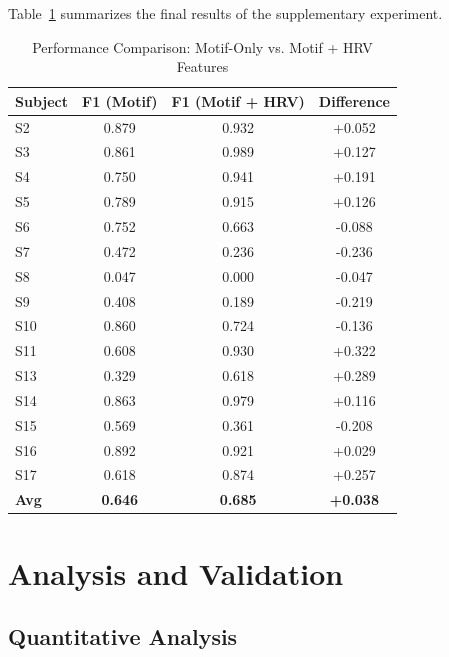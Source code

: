 \documentclass[conference,10pt]{IEEEtran}
\begin{document}
Table~\ref{tab:hrv_comparison} summarizes the final results of the supplementary experiment. 

\begin{table}[htbp]
\centering
\scriptsize
\renewcommand{\arraystretch}{0.85}
\caption{Performance Comparison: Motif-Only vs. Motif + HRV Features}
\label{tab:hrv_comparison}
\begin{tabular}{lccc}
\hline
\textbf{Subject} & \textbf{F1 (Motif)} & \textbf{F1 (Motif + HRV)} & \textbf{Difference} \\
\hline
S2  & 0.879 & 0.932 & +0.052 \\
S3  & 0.861 & 0.989 & +0.127 \\
S4  & 0.750 & 0.941 & +0.191 \\
S5  & 0.789 & 0.915 & +0.126 \\
S6  & 0.752 & 0.663 & -0.088 \\
S7  & 0.472 & 0.236 & -0.236 \\
S8  & 0.047 & 0.000 & -0.047 \\
S9  & 0.408 & 0.189 & -0.219 \\
S10 & 0.860 & 0.724 & -0.136 \\
S11 & 0.608 & 0.930 & +0.322 \\
S13 & 0.329 & 0.618 & +0.289 \\
S14 & 0.863 & 0.979 & +0.116 \\
S15 & 0.569 & 0.361 & -0.208 \\
S16 & 0.892 & 0.921 & +0.029 \\
S17 & 0.618 & 0.874 & +0.257 \\
\hline
\textbf{Avg} & \textbf{0.646} & \textbf{0.685} & \textbf{+0.038} \\
\hline
\end{tabular}
\end{table}





\section{Analysis and Validation}

\subsection{Quantitative Analysis}
\end{document}
